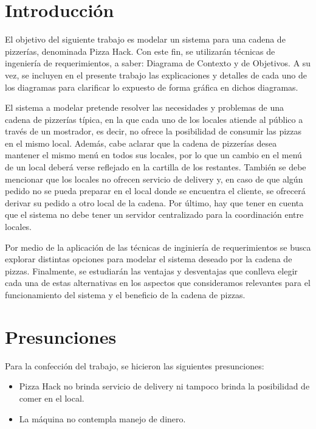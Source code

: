 \documentclass[a4paper,11pt] {article}
\begin{document}
\section*{Introducci\'on}

El objetivo del siguiente trabajo es modelar un sistema para una cadena de pizzer\'ias, denominada Pizza Hack. Con este fin, se utilizar\'an t\'ecnicas de ingenier\'ia de requerimientos, a saber: Diagrama de Contexto y de Objetivos. A su vez, se incluyen en el presente trabajo las explicaciones y detalles de cada uno de los diagramas para clarificar lo expuesto de forma gr\'afica en dichos diagramas. 

El sistema a modelar pretende resolver las necesidades y problemas de una cadena de pizzer\'ias t\'ipica, en la que cada uno de los locales atiende al p\'ublico a trav\'es de un mostrador, es decir, no ofrece la posibilidad de consumir las pizzas en el mismo local. Adem\'as, cabe aclarar que la cadena de pizzer\'ias desea mantener el mismo men\'u en todos sus locales, por lo que un cambio en el men\'u de un local deber\'a verse reflejado en la cartilla de los restantes. Tambi\'en se debe mencionar que los locales no ofrecen servicio de delivery y, en caso de que alg\'un pedido no se pueda preparar en el local donde se encuentra el cliente, se ofrecer\'a derivar su pedido a otro local de la cadena. Por \'ultimo, hay que tener en cuenta que el sistema no debe tener un servidor centralizado para la coordinaci\'on entre locales.

Por medio de la aplicaci\'on de las t\'ecnicas de inginier\'ia de requerimientos se busca explorar distintas opciones para modelar el sistema deseado por la cadena de pizzas. Finalmente, se estudiar\'an las ventajas y desventajas que conlleva elegir cada una de estas alternativas en los aspectos que consideramos relevantes para el funcionamiento del sistema y el beneficio de la cadena de pizzas.  

\section*{Presunciones}

Para la confección del trabajo, se hicieron las siguientes presunciones:

\begin{itemize}
    \item Pizza Hack no brinda servicio de delivery ni tampoco brinda la posibilidad de comer en el local.
    \item La máquina no contempla manejo de dinero.

\end{itemize}
\end{document}

